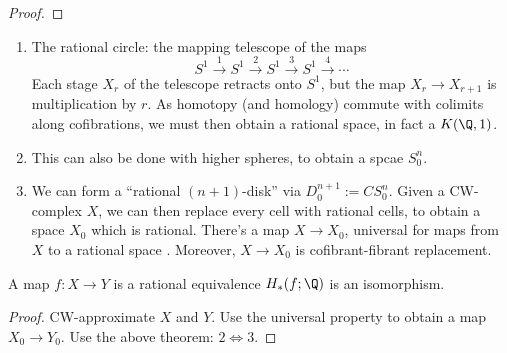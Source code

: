 \documentclass[11pt]{article}
\begin{document}
\begin{JeremyRationalHomotopyPractice}
\begin{proof}
\end{proof}
\begin{exmps*}
\begin{enumerate}\squishlist
\item The rational circle: the mapping telescope of the maps
\[S^1\overset{1}{\to}S^1\overset{2}{\to}S^1\overset{3}{\to}S^1\overset{4}{\to}\cdots\]
Each stage $X_r$ of the telescope retracts onto $S^1$, but the map $X_r\to X_{r+1}$ is multiplication by $r$. As homotopy (and homology) commute with colimits along cofibrations, we must then obtain a rational space, in fact a $K(\Q,1)$.
\item This can also be done with higher spheres, to obtain a spcae $S^n_0$.
\item We can form a ``rational $(n+1)$-disk'' via $D_0^{n+1}:=CS^n_0$. Given a CW-complex $X$, we can then replace every cell with rational cells, to obtain a space $X_0$ which is rational. There's a map $X\to X_0$, universal for maps from $X$ to a rational space . Moreover, $X\to X_0$ is cofibrant-fibrant replacement. 
\end{enumerate}
\end{exmps*}
\begin{thm*}
A map $f:X\to Y$ is a rational equivalence \Iff $H_{*}(f;\Q)$ is an isomorphism.
\end{thm*}
\begin{proof}
CW-approximate $X$ and $Y$. Use the universal property to obtain a map $X_0\to Y_0$. Use the above theorem: $2\iff 3$.
\end{proof}

\end{JeremyRationalHomotopyPractice}
\end{document}
